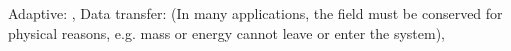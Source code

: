 Adaptive: \cite{Dukowicz1987, Babuska1978}, Data transfer:
\cite{Jiao2004, Farrell2009, Farrell2011} (In many applications, the field
must be conserved for physical reasons,
e.g. mass or energy cannot leave or enter the system),










